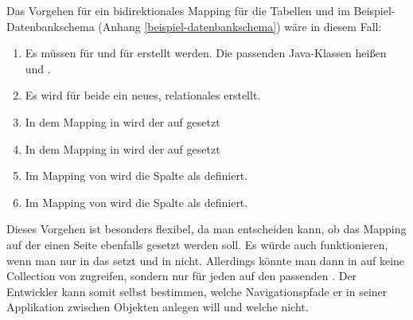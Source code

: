 Das Vorgehen für ein bidirektionales Mapping für die Tabellen  und  im Beispiel-Datenbankschema (Anhang \ref{beispiel-datenbankschema}) wäre in diesem Fall: \\
\begin{enumerate}
\item Es müssen  für  und für  erstellt werden. Die passenden Java-Klassen heißen  und .
\item Es wird für beide  ein neues, relationales  erstellt.
\item In dem Mapping in  wird der  auf  gesetzt
\item In dem Mapping in  wird der  auf  gesetzt
\item Im Mapping von  wird die Spalte  als  definiert.
\item Im Mapping von  wird die Spalte  als  definiert.
\end{enumerate}
Dieses Vorgehen ist besonders flexibel, da man entscheiden kann, ob das Mapping auf der einen Seite ebenfalls gesetzt werden soll. Es würde auch funktionieren, wenn man nur in  das  setzt und in  nicht. Allerdings könnte man dann in  auf keine Collection von  zugreifen, sondern nur für jeden  auf den passenden . Der Entwickler kann somit selbst bestimmen, welche Navigationspfade er in seiner Applikation zwischen Objekten anlegen will und welche nicht.\\
\\
